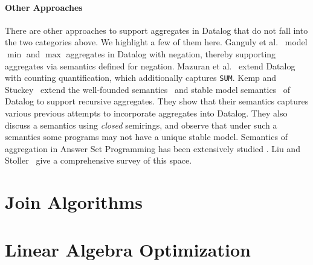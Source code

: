  \paragraph*{\bf Other Approaches}
 There are other approaches to support aggregates in Datalog that do not fall into
  the two categories above. We highlight a few of them here.
  Ganguly et al.~\cite{DBLP:conf/pods/GangulyGZ91}
  model $\min$ and $\max$ aggregates in Datalog with negation,
  thereby supporting aggregates via semantics defined for negation.
  Mazuran et al.~\cite{DBLP:journals/tplp/MazuranSZ13}
  extend Datalog with counting quantification,
  which additionally captures \texttt{SUM}.
 Kemp and Stuckey~\cite{DBLP:conf/slp/KempS91} extend the well-founded semantics~\cite{DBLP:journals/jacm/GelderRS91, DBLP:conf/pods/Gelder89}
  and stable model semantics~\cite{DBLP:conf/iclp/GelfondL88} of Datalog
  to support recursive aggregates.
 They show that their semantics captures various previous attempts to incorporate aggregates into Datalog.
 They also discuss a semantics using {\em closed} semirings, and observe that under such a semantics
  some programs may not have a unique stable model.
 Semantics of aggregation in Answer Set Programming has been extensively studied
  \cite{DBLP:journals/ai/FaberPL11, DBLP:journals/tplp/GelfondZ14, DBLP:journals/fuin/Alviano16}.
 Liu and Stoller~\cite{DBLP:conf/lfcs/LiuS22} give a comprehensive survey of this space.

\section{Join Algorithms}
\label{sec:related:joins}

\section{Linear Algebra Optimization}
\label{sec:related:linear-algebra}

